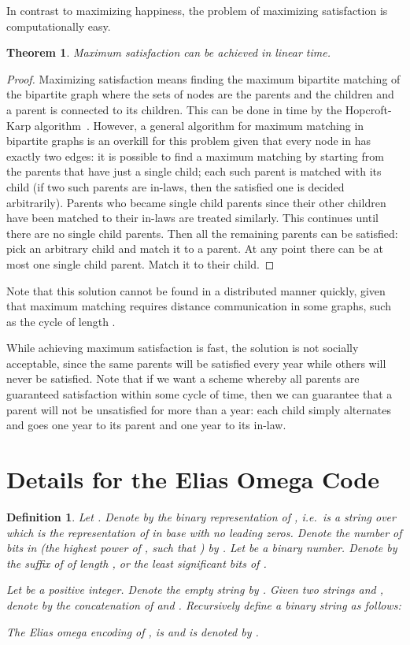 \documentclass[11pt]{article}
\newtheorem{definition}{Definition}[section]
\newtheorem{theorem}{Theorem}[section]
\begin{document}
In contrast to maximizing happiness, the problem of maximizing satisfaction is computationally easy.

\begin{theorem}\label{t:bpm}
Maximum satisfaction can be achieved in linear time.
\end{theorem}

\begin{proof} Maximizing satisfaction means finding the maximum
bipartite matching of the bipartite graph  where the sets of nodes are the parents  and the children  and a parent is connected to its children. This can be done in time
 by the Hopcroft-Karp algorithm~\cite{hk:73}. 
However, a general algorithm for maximum matching in bipartite graphs is an overkill for this problem given that every node in  has exactly two edges: it is possible to find a maximum matching by starting from the parents that have just a single child; each such parent is matched with its child (if two such parents are in-laws, then the satisfied one is decided arbitrarily). Parents who became single child parents since their other children have been matched to their in-laws are treated similarly.
This continues until there are no single child parents. Then all the remaining parents can be satisfied: pick an arbitrary child and match it to a parent. At any point there can be at most one single child parent. Match it to their child.
 \end{proof}

Note that this solution cannot  be found in a distributed manner quickly, given that maximum matching requires  distance communication in some graphs, such as the cycle of length .

While achieving maximum satisfaction is fast, the solution is not
socially acceptable, since the same parents will be satisfied every
year while others will never be satisfied.
Note that if we want a scheme whereby all parents are guaranteed satisfaction within some cycle of time, then we can guarantee that a parent will not be unsatisfied for more than a year: each child simply alternates and goes one year to its parent and one year to its in-law.

\section{Details for the Elias Omega Code}
\begin{definition}\label{d:elias}
Let . Denote by  the binary representation of
, i.e.\  is a string over  which is the
representation of  in base  with no leading zeros.
Denote the number of bits in  (the highest power of , 
such that ) by . Let  be a binary
number. Denote by   the suffix of  of length , or the
 least significant bits of .

Let  be a positive integer. Denote the empty string by
. Given two strings  and , denote by  the concatenation of  and . Recursively define a binary string  as follows:


The {\em Elias omega encoding} of
, is  and is denoted by .
\end{definition}
\end{document}
